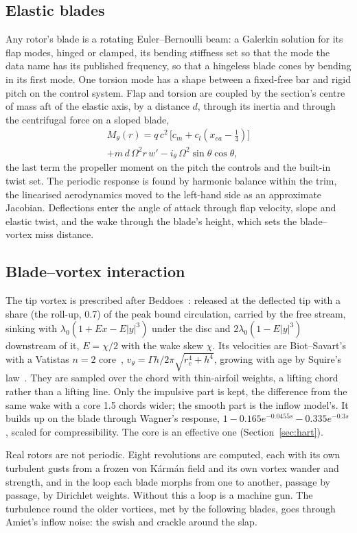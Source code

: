 \documentclass[10pt,a4paper,twocolumn]{article}
\begin{document}
\subsection{Elastic blades}
Any rotor's blade is a rotating Euler--Bernoulli beam: a Galerkin solution for its flap modes, hinged or clamped, its bending stiffness set so that the mode the data name has its published frequency, so that a hingeless blade cones by bending in its first mode. One torsion mode has a shape between a fixed-free bar and rigid pitch on the control system. Flap and torsion are coupled by the section's centre of mass aft of the elastic axis, by a distance $d$, through its inertia and through the centrifugal force on a sloped blade,
\begin{multline}
M_\theta(r) = q\,c^2\,\bigl[c_m + c_l(x_{ea}-\tfrac14)\bigr]\\
+ m\,d\,\Omega^2 r\,w' - i_\theta\,\Omega^2\sin\theta\cos\theta ,
\end{multline}
the last term the propeller moment on the pitch the controls and the built-in twist set. The periodic response is found by harmonic balance within the trim, the linearised aerodynamics moved to the left-hand side as an approximate Jacobian. Deflections enter the angle of attack through flap velocity, slope and elastic twist, and the wake through the blade's height, which sets the blade--vortex miss distance.

\subsection{Blade--vortex interaction}
The tip vortex is prescribed after Beddoes~\cite{beddoes}: released at the deflected tip with a share (the roll-up, 0.7) of the peak bound circulation, carried by the free stream, sinking with $\lambda_0(1+Ex-E|y|^3)$ under the disc and $2\lambda_0(1-E|y|^3)$ downstream of it, $E=\chi/2$ with the wake skew $\chi$. Its velocities are Biot--Savart's with a Vatistas $n=2$ core~\cite{vatistas}, $v_\theta=\Gamma h/2\pi\sqrt{r_c^4+h^4}$, growing with age by Squire's law~\cite{squire}. They are sampled over the chord with thin-airfoil weights, a lifting chord rather than a lifting line. Only the impulsive part is kept, the difference from the same wake with a core 1.5 chords wider; the smooth part is the inflow model's. It builds up on the blade through Wagner's response, $1-0.165e^{-0.0455s}-0.335e^{-0.3s}$, scaled for compressibility. The core is an effective one (Section~\ref{sec:hart}).

Real rotors are not periodic. Eight revolutions are computed, each with its own turbulent gusts from a frozen von K\'arm\'an field and its own vortex wander and strength, and in the loop each blade morphs from one to another, passage by passage, by Dirichlet weights. Without this a loop is a machine gun. The turbulence round the older vortices, met by the following blades, goes through Amiet's inflow noise: the swish and crackle around the slap.
\end{document}
